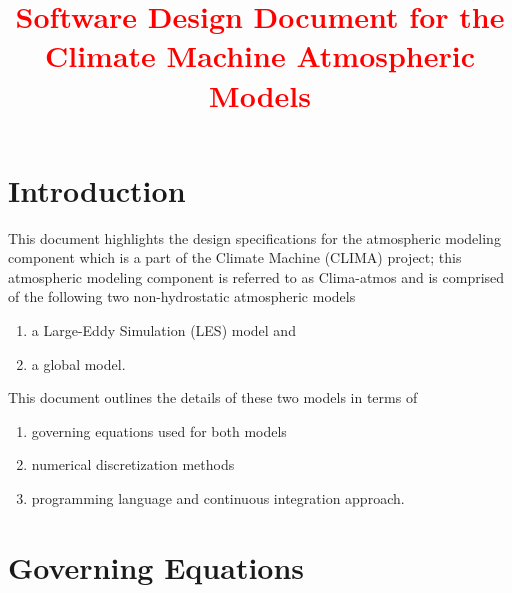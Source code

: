 \documentclass[12pt]{article}
\begin{document}
\title{ \textcolor{red}{Software Design Document for the Climate Machine Atmospheric Models} }
\author{ }

\maketitle
\tableofcontents




\section{Introduction}
\label{sec:introduction}

This document highlights the design specifications for the atmospheric modeling component which is a part of the Climate Machine (CLIMA) project; this atmospheric modeling component is referred to as Clima-atmos and is comprised of the following two non-hydrostatic atmospheric models  
\begin{enumerate}
\item a Large-Eddy Simulation (LES) model and 
\item a global model.
\end{enumerate}
This document outlines the details of these two models in terms of 
\begin{enumerate}
\item governing equations  used for both models
\item numerical discretization methods
\item programming language and continuous integration approach.
\end{enumerate}


\section{Governing Equations}
\label{sec:governing_equations}
\end{document}
